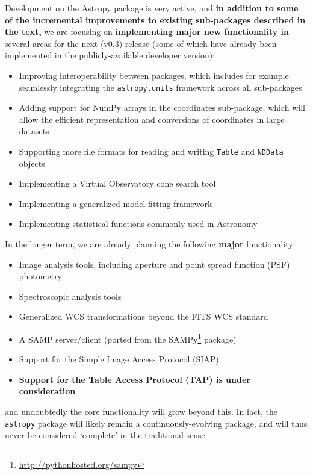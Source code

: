 \documentclass[traditabstract]{aa}
\newcommand{\astropy}{\texttt{astropy}\xspace}
\begin{document}
\label{sec:future}


Development on the Astropy package is very active, and \textbf{in addition to
some of the incremental improvements to existing sub-packages described in the
text,} we are focusing on \textbf{implementing major new functionality in}
several areas for the next (v0.3) release (some of which have already been
implemented in the publicly-available developer version):

\begin{itemize}
\item Improving interoperability between packages, which includes for example seamlessly integrating the \texttt{astropy.units} framework across all sub-packages
\item Adding support for NumPy arrays in the coordinates sub-package, which will allow the efficient representation and conversions of coordinates in large datasets
\item Supporting more file formats for reading and writing \texttt{Table} and \texttt{NDData} objects
\item Implementing a Virtual Observatory cone search tool \textbf{\citep{vo-cone-search}}
\item Implementing a generalized model-fitting framework
\item Implementing statistical functions commonly used in Astronomy
\end{itemize}

In the longer term, we are already planning the following \textbf{major} functionality:

\begin{itemize}
\item Image analysis tools, including aperture and point spread function (PSF) photometry
\item Spectroscopic analysis tools
\item Generalized WCS transformations beyond the FITS WCS standard
\item A SAMP server/client (ported from the SAMPy\footnote{\url{http://pythonhosted.org/sampy}} package)
\item Support for the Simple Image Access Protocol (SIAP) \textbf{\citep{vo-siap}}
\item \textbf{Support for the Table Access Protocol (TAP) \citep{vo-tap} is under consideration}
\end{itemize}

\noindent and undoubtedly the core functionality will grow beyond this. In
fact, the \astropy package will likely remain a continuously-evolving package,
and will thus never be considered `complete' in the traditional sense.
\end{document}
